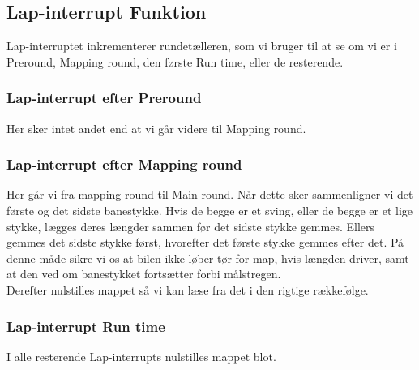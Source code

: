 \subsection{Lap-interrupt Funktion}

Lap-interruptet inkrementerer rundetælleren, som vi bruger til at se om vi er i Preround, Mapping round, den første Run time, eller de resterende.

\subsubsection{Lap-interrupt efter Preround}

Her sker intet andet end at vi går videre til Mapping round.

\subsubsection{Lap-interrupt efter Mapping round}

Her går vi fra mapping round til Main round. Når dette sker sammenligner vi det første og det sidste banestykke. Hvis de begge er et sving, eller de begge er et lige stykke, lægges deres længder sammen før det sidste stykke gemmes. Ellers gemmes det sidste stykke først, hvorefter det første stykke gemmes efter det. På denne måde sikre vi os at bilen ikke løber tør for map, hvis længden driver, samt at den ved om banestykket fortsætter forbi målstregen.
\\
Derefter nulstilles mappet så vi kan læse fra det i den rigtige rækkefølge.

\subsubsection{Lap-interrupt Run time}

I alle resterende Lap-interrupts nulstilles mappet blot.

